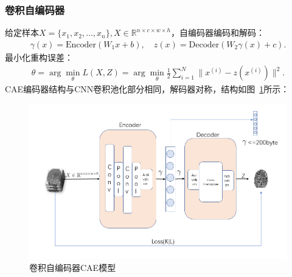 \documentclass{whutmod}
\begin{document}
            \subsubsection{卷积自编码器}
                给定样本$X = \{x_1, x_2, \dots, x_n\}, X \in \mathbb{R}^{n \times c \times w \times h}$，自编码器编码和解码：
                \begin{gather}
                    \gamma(x) = \text{Encoder}(W_1 x + b), \quad z(x) = \text{Decoder}(W_2 \gamma(x) + c).
                \end{gather}
                最小化重构误差：
                \begin{gather}
                    \theta = \arg \min_\theta L(X,Z) = \arg \min_\theta \frac{1}{2} \sum_{i=1}^N \| x^{(i)} - z(x^{(i)}) \|^2.
                \end{gather}
                CAE编码器结构与CNN卷积池化部分相同，解码器对称，结构如图~\ref{labssel}所示：

                \begin{figure}[H]
                    \centering
                    \includegraphics[width=\textwidth]{figures/model.png}
                    \caption{卷积自编码器CAE模型}\label{labssel}
                \end{figure}
\end{document}
